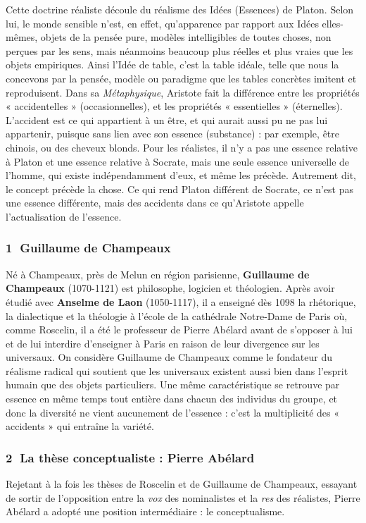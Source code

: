Cette doctrine réaliste découle du réalisme des Idées (Essences) de Platon. Selon lui, le monde sensible n’est, en effet, qu’apparence par rapport aux Idées elles-mêmes, objets de la pensée pure, modèles intelligibles de toutes choses, non perçues par les sens, mais néanmoins beaucoup plus réelles et plus vraies que les objets empiriques. Ainsi l’Idée de table, c’est la table idéale, telle que nous la concevons par la pensée, modèle ou paradigme que les tables concrètes imitent et reproduisent. Dans sa \textit{Métaphysique}, Aristote fait la différence entre les propriétés « accidentelles » (occasionnelles), et les propriétés « essentielles » (éternelles). L’accident est ce qui appartient à un être, et qui aurait aussi pu ne pas lui appartenir, puisque sans lien avec son essence (substance) : par exemple, être chinois, ou des cheveux blonds. Pour les réalistes, il n’y a pas une essence relative à Platon et une essence relative à Socrate, mais une seule essence universelle de l’homme, qui existe indépendamment d’eux, et même les précède. Autrement dit, le concept précède la chose. Ce qui rend Platon différent de Socrate, ce n’est pas une essence différente, mais des accidents dans ce qu’Aristote appelle l’actualisation de l’essence.

\subsubsection*{\textcircled{\scriptsize 1} Guillaume de Champeaux}
Né à Champeaux, près de Melun en région parisienne, \textbf{Guillaume de Champeaux} (1070-1121) est philosophe, logicien et théologien. Après avoir étudié avec \textbf{Anselme de Laon} (1050-1117), il a enseigné dès 1098 la rhétorique, la dialectique et la théologie à l’école de la cathédrale Notre-Dame de Paris où, comme Roscelin, il a été le professeur de Pierre Abélard avant de s’opposer à lui et de lui interdire d’enseigner à Paris en raison de leur divergence sur les universaux. On considère Guillaume de Champeaux comme le fondateur du réalisme radical qui soutient que les universaux existent aussi bien dans l’esprit humain que des objets particuliers. Une même caractéristique se retrouve par essence en même temps tout entière dans chacun des individus du groupe, et donc la diversité ne vient aucunement de l’essence : c’est la multiplicité des « accidents » qui entraîne la variété.

\subsubsection*{\textcircled{\scriptsize 2} La thèse conceptualiste : Pierre Abélard}
Rejetant à la fois les thèses de Roscelin et de Guillaume de Champeaux, essayant de sortir de l’opposition entre la \textit{vox} des nominalistes et la \textit{res} des réalistes, Pierre Abélard a adopté une position intermédiaire : le conceptualisme.

